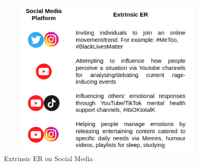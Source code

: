 \documentclass[lettersize,journal]{IEEEtran}
\begin{document}
\begin{figure}[h]
  
    \centering
    \includegraphics[width=12cm,height=8cm,keepaspectratio]{ExtrinsicSM.png}
  \caption{Extrinsic ER on Social Media}
  \label{fig:ExtrinsicSM}
  \end{figure}
\end{document}
